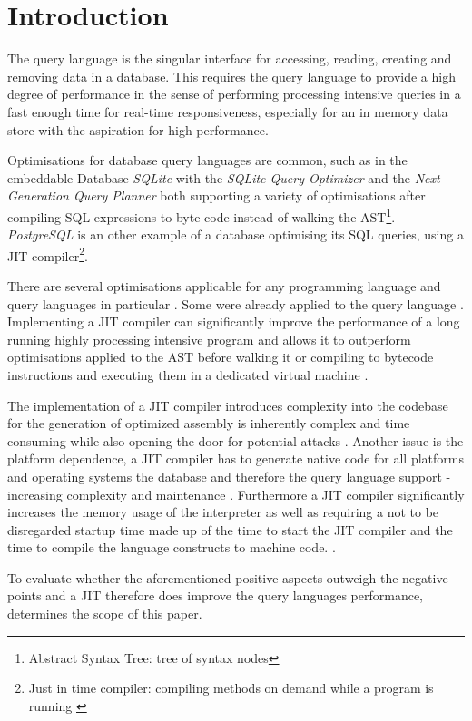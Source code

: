\chapter{Introduction}

The query language is the singular interface for accessing, reading, creating
and removing data in a database. This requires the query language to provide a
high degree of performance in the sense of performing processing intensive
queries in a fast enough time for real-time responsiveness, especially for an
in memory data store with the aspiration for high performance.

Optimisations for database query languages are common, such as in the
embeddable Database \textit{SQLite} with the \textit{SQLite Query
Optimizer}\cite{sqlite_query_opt} and the \textit{Next-Generation Query
Planner}\cite{sqlite_query_opt} both supporting a variety of optimisations
after compiling SQL expressions to byte-code instead of walking the
AST\footnote{Abstract Syntax Tree: tree of syntax
nodes}\cite{sqlite_next_gen_query_plan}. \textit{PostgreSQL} is an other
example of a database optimising its SQL queries, using a JIT compiler\footnote{Just in
time compiler: compiling methods on demand while a program is running \cite[1.
Introduction]{java_jit_compilation}}\cite{postgres_jit}.

There are several optimisations applicable for any programming language and
query languages in particular \cite[3.3 Optimisations]{java_jit_region_based}.
Some were already applied to the query language \cite{parser2_opt}.
Implementing a JIT compiler can significantly improve the performance of a long
running highly processing intensive program and allows it to outperform
optimisations applied to the AST before walking it or compiling to bytecode
instructions and executing them in a dedicated virtual machine \cite[4.
Results]{java_jit_compilation}. 

The implementation of a JIT compiler introduces complexity into the codebase
for the generation of optimized assembly is inherently complex and time
consuming \cite[1. Introduction]{impl_jit} while also opening the door for
potential attacks \cite[2. Challenges Securing JavaScript JIT]{js_jit_fuzzing}
\cite[Table 1.]{js_jit_fuzzing}. Another issue is the platform dependence, a
JIT compiler has to generate native code for all platforms and operating
systems the database and therefore the query language support - increasing
complexity and maintenance \cite[Abstract]{java_jit_effectiveness}. Furthermore
a JIT compiler significantly increases the memory usage \cite[Fig.
1.]{brief_history_of_jit} of the interpreter as well as requiring a not to be
disregarded startup time made up of the time to start the JIT compiler and the
time to compile the language constructs to machine code. \cite[4.2.7 Breakdown
of compilation times]{java_jit_effectiveness}.

To evaluate whether the aforementioned positive aspects outweigh the negative
points and a JIT therefore does improve the query languages performance,
determines the scope of this paper.
